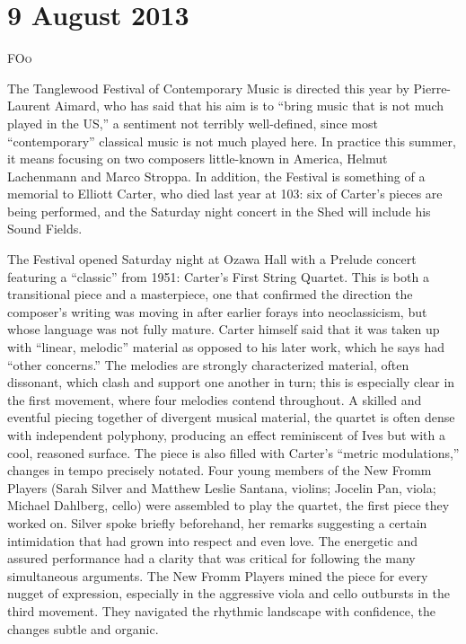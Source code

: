 \chapter{9 August 2013}

\textsc{FOo}

The Tanglewood Festival of Contemporary Music is directed this year by Pierre-Laurent Aimard, who has said that his aim is to “bring music that is not much played in the US,” a sentiment not terribly well-defined, since most “contemporary” classical music is not much played here. In practice this summer, it means focusing on two composers little-known in America, Helmut Lachenmann and Marco Stroppa. In addition, the Festival is something of a memorial to Elliott Carter, who died last year at 103: six of Carter’s pieces are being performed, and the Saturday night concert in the Shed will include his Sound Fields.

The Festival opened Saturday night at Ozawa Hall with a Prelude concert featuring a “classic” from 1951: Carter’s First String Quartet. This is both a transitional piece and a masterpiece, one that confirmed the direction the composer’s writing was moving in after earlier forays into neoclassicism, but whose language was not fully mature. Carter himself said that it was taken up with “linear, melodic” material as opposed to his later work, which he says had “other concerns.” The melodies are strongly characterized material, often dissonant, which clash and support one another in turn; this is especially clear in the first movement, where four melodies contend throughout. A skilled and eventful piecing together of divergent musical material, the quartet is often dense with independent polyphony, producing an effect reminiscent of Ives but with a cool, reasoned surface. The piece is also filled with Carter’s “metric modulations,” changes in tempo precisely notated. Four young members of the New Fromm Players (Sarah Silver and Matthew Leslie Santana, violins; Jocelin Pan, viola; Michael Dahlberg, cello) were assembled to play the quartet, the first piece they worked on. Silver spoke briefly beforehand, her remarks suggesting a certain intimidation that had grown into respect and even love. The energetic and assured performance had a clarity that was critical for following the many simultaneous arguments. The New Fromm Players mined the piece for every nugget of expression, especially in the aggressive viola and cello outbursts in the third movement. They navigated the rhythmic landscape with confidence, the changes subtle and organic.

